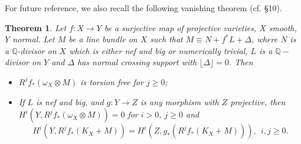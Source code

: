\documentclass[10pt]{amsart}
\newtheorem{thm}{Theorem}[section]
\newcommand\lra{\longrightarrow}
\newcommand\ot{{\otimes}}
\newcommand\Q{{\mathbb{Q}}}
\begin{document}
For future reference, we also recall the following vanishing theorem 
(cf. \cite{Ko3} \S 10).
\begin{thm} \label{omegavan}Let $f\colon X\to  Y$ be a  surjective 
map of projective
varieties, $X$ smooth, $Y$ normal. Let $M$ be a line bundle on $X$
such that $M\equiv N+f^* L +\Delta$, where $N$ is a 
$\Q$-divisor on $X$ which is either
nef and big or numerically trivial, $L$
is a $\Q-$divisor on $Y$
and $\Delta$ has normal crossing support with 
$\lfloor \Delta \rfloor=0$. Then
\begin{itemize}
\item $R^jf_*(\omega _X\ot M) $ is torsion free for $j\geq 0$;

\item If $L$ is nef and big, and $g:Y\lra Z$ is any morphism with $Z$ 
projective,
then $H^i(Y,R^jf_*(\omega _X\ot M))
=0$ for $i>0$, $j\geq 0$ and
$$H^i(Y,R^jf_*(K_X+M))=H^i(Z,g_*(R^jf_*(K_X+M))),\ \ i,j\geq 0.$$


\end{itemize}
\end{thm}
\end{document}
